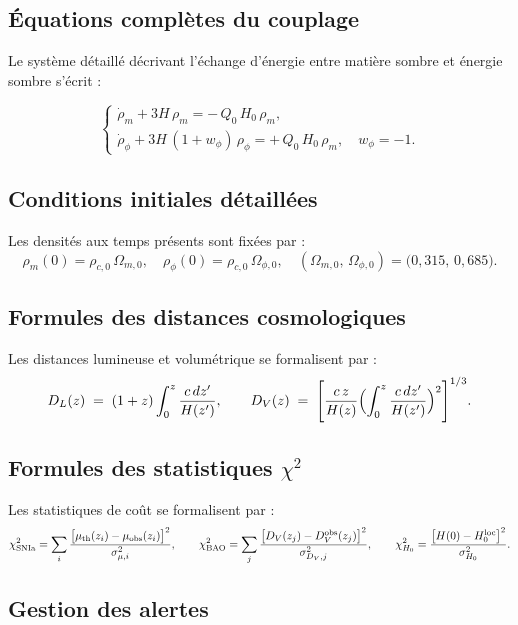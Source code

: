 \subsection{Équations complètes du couplage}

Le système détaillé décrivant l’échange d’énergie entre matière sombre et énergie sombre s’écrit :

\[
  \begin{cases}
    \dot{\rho}_{m} + 3H\,\rho_{m}
      = -\,Q_{0}\,H_{0}\,\rho_{m},\\[6pt]
    \dot{\rho}_{\phi} + 3H\,(1 + w_{\phi})\,\rho_{\phi}
      = +\,Q_{0}\,H_{0}\,\rho_{m},
    \quad w_{\phi} = -1.
  \end{cases}
\]

\subsection{Conditions initiales détaillées}

Les densités aux temps présents sont fixées par :
\[
  \rho_{m}(0) = \rho_{c,0}\,\Omega_{m,0}, 
  \quad
  \rho_{\phi}(0) = \rho_{c,0}\,\Omega_{\phi,0},
  \quad
  (\Omega_{m,0},\,\Omega_{\phi,0}) = \bigl(0{,}315,\,0{,}685\bigr).
\]

\subsection{Formules des distances cosmologiques}

Les distances lumineuse et volumétrique se formalisent par :
\[
  D_{L}(z) \;=\; (1+z)\int_{0}^{z} \frac{c\,dz'}{H(z')},
  \qquad
  D_{V}(z) \;=\; \Biggl[\frac{c\,z}{H(z)}\Bigl(\int_{0}^{z}\frac{c\,dz'}{H(z')}\Bigr)^{2}\Biggr]^{1/3}.
\]

\subsection{Formules des statistiques \(\chi^{2}\)}

Les statistiques de coût se formalisent par :
\[
  \chi^{2}_{\rm SNIa}
  = \sum_{i}
    \frac{\bigl[\mu_{\rm th}(z_{i}) - \mu_{\rm obs}(z_{i})\bigr]^{2}}
         {\sigma_{\mu,i}^{2}},
  \qquad
  \chi^{2}_{\rm BAO}
  = \sum_{j}
    \frac{\bigl[D_{V}(z_{j}) - D_{V}^{\rm obs}(z_{j})\bigr]^{2}}
         {\sigma_{D_{V},j}^{2}},
  \qquad
  \chi^{2}_{H_{0}}
  = \frac{\bigl[H(0) - H_{0}^{\rm loc}\bigr]^{2}}
         {\sigma_{H_{0}}^{2}}.
\]

\subsection{Gestion des alertes}

